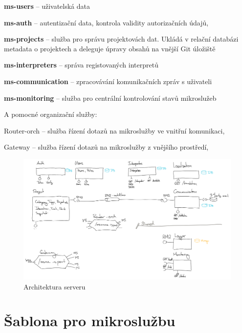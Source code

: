 \begin{ul}
   \item \textbf{ms-users} – uživatelská data
   \item \textbf{ms-auth} – autentizační data, kontrola validity autorizačních údajů,
   \item \textbf{ms-projects} – služba pro správu projektovách dat.
   Ukládá v relační databázi metadata o projektech a deleguje úpravy obsahů na vnější Git úložiště
   \item \textbf{ms-interpreters} – správa registovaných interpretů
   \item \textbf{ms-communication} – zpracovávání komunikačních zpráv s uživateli
   \item \textbf{ms-monitoring} – služba pro centrální kontrolování stavů mikroslužeb
\end{ul}

A pomocné organizační služby:

\begin{dl}
   \item[Router-orch] – služba řízení dotazů na mikroslužby ve vnitřní komunikaci,
   \item[Gateway] – služba řízení dotazů na mikroslužby z vnějšího prostředí,
\end{dl}

\begin{figure}[htbp]
   \centering
   \includegraphics[max width=\textwidth]{assets/draft-server-arch}
   \caption{Architektura serveru}\label{fig:server-arch}
\end{figure}



\section{Šablona pro mikroslužbu}\label{sec:server-template}

